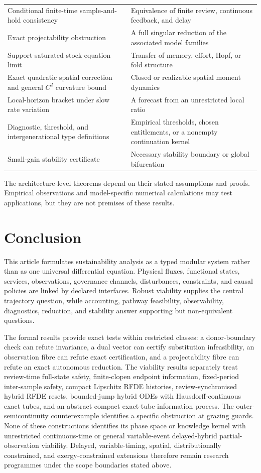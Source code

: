 \documentclass[11pt]{article}
\theoremstyle{definition}
\begin{document}
\begin{table}[h]
\begin{tabularx}{\textwidth}{X X}
Conditional finite-time sample-and-hold consistency & Equivalence of finite review, continuous feedback, and delay\\
Exact projectability obstruction & A full singular reduction of the associated model families\\
Support-saturated stock-equation limit & Transfer of memory, effort, Hopf, or fold structure\\
Exact quadratic spatial correction and general $C^2$ curvature bound & Closed or realizable spatial moment dynamics\\
Local-horizon bracket under slow rate variation & A forecast from an unrestricted local ratio\\
Diagnostic, threshold, and intergenerational type definitions & Empirical thresholds, chosen entitlements, or a nonempty continuation kernel\\
Small-gain stability certificate & Necessary stability boundary or global bifurcation\\
\bottomrule
\end{tabularx}
\end{table}

The architecture-level theorems depend on their stated assumptions and proofs. Empirical observations and model-specific numerical calculations may test applications, but they are not premises of these results.

\section{Conclusion}

This article formulates sustainability analysis as a typed modular system rather than as one universal differential equation. Physical fluxes, functional states, services, observations, governance channels, disturbances, constraints, and causal policies are linked by declared interfaces. Robust viability supplies the central trajectory question, while accounting, pathway feasibility, observability, diagnostics, reduction, and stability answer supporting but non-equivalent questions.

The formal results provide exact tests within restricted classes: a donor-boundary check can refute invariance, a dual vector can certify substitution infeasibility, an observation fibre can refute exact certification, and a projectability fibre can refute an exact autonomous reduction. The viability results separately treat review-time full-state safety, finite-clopen endpoint information, fixed-period inter-sample safety, compact Lipschitz RFDE histories, review-synchronised hybrid RFDE resets, bounded-jump hybrid ODEs with Hausdorff-continuous exact tubes, and an abstract compact exact-tube information process. The outer-semicontinuity counterexample identifies a specific obstruction at grazing guards. None of these constructions identifies its phase space or knowledge kernel with unrestricted continuous-time or general variable-event delayed-hybrid partial-observation viability. Delayed, variable-timing, spatial, distributionally constrained, and exergy-constrained extensions therefore remain research programmes under the scope boundaries stated above.
\end{document}
